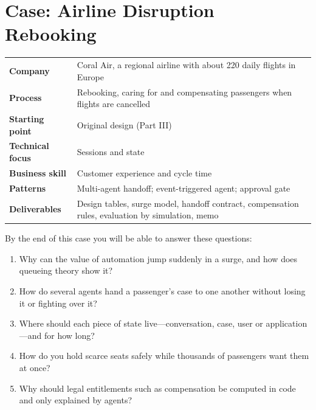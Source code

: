 
\chapter{Case: Airline Disruption Rebooking}
\label{ch:case-airline}

\begin{caseglance}
\begin{tabularx}{\linewidth}{@{}>{\bfseries}p{3.4cm}X@{}}
Company & Coral Air, a regional airline with about 220 daily flights in Europe \\
Process & Rebooking, caring for and compensating passengers when flights are cancelled \\
Starting point & Original design (Part III) \\
Technical focus & Sessions and state \\
Business skill & Customer experience and cycle time \\
Patterns & Multi-agent handoff; event-triggered agent; approval gate \\
Deliverables & Design tables, surge model, handoff contract, compensation rules, evaluation by simulation, memo
\end{tabularx}
\end{caseglance}

\begin{chapterquestions}
By the end of this case you will be able to answer these questions:
\begin{enumerate}[leftmargin=*,itemsep=2pt]
  \item Why can the value of automation jump suddenly in a surge, and how does queueing theory show it?
  \item How do several agents hand a passenger's case to one another without losing it or fighting over it?
  \item Where should each piece of state live---conversation, case, user or application---and for how long?
  \item How do you hold scarce seats safely while thousands of passengers want them at once?
  \item Why should legal entitlements such as compensation be computed in code and only explained by agents?
\end{enumerate}
\end{chapterquestions}

